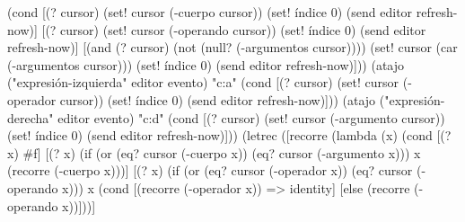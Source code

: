 \documentclass[letterpaper, twoside, openright, 11pt]{book}%
\begin{document}
{{           (cond [(? cursor)
                  (set! cursor (-cuerpo cursor))
                  (set! índice 0)
                  (send editor refresh-now)]
                 [(? cursor)
                  (set! cursor (-operando cursor))
                  (set! índice 0)
                  (send editor refresh-now)]
                 [(and (? cursor)
                       (not (null? (-argumentos cursor))))
                  (set! cursor (car (-argumentos cursor)))
                  (set! índice 0)
                  (send editor refresh-now)]))
    (atajo ("expresión-izquierda" editor evento) "c:a"
           (cond [(? cursor)
                  (set! cursor (-operador cursor))
                  (set! índice 0)
                  (send editor refresh-now)]))
    (atajo ("expresión-derecha" editor evento) "c:d"
           (cond [(? cursor)
                  (set! cursor (-argumento cursor))
                  (set! índice 0)
                  (send editor refresh-now)]))
    (letrec ([recorre
              (lambda (x)
                (cond [(? x) #f]
                      [(? x)
                       (if (or (eq? cursor (-cuerpo x))
                               (eq? cursor (-argumento x)))
                           x
                           (recorre (-cuerpo x)))]
                      [(? x)
                       (if (or (eq? cursor (-operador x))
                               (eq? cursor (-operando x)))
                           x
                           (cond [(recorre (-operador x))
                                  => identity]
                                 [else (recorre (-operando x))]))]
}}
\end{document}

